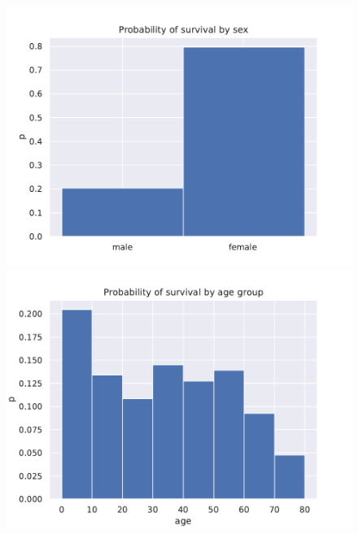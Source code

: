 \documentclass{book}
\begin{document}
\begin{figure}
    \centering
    \includegraphics[scale=.75]{../figs/prob_hist_sex.pdf}
    \includegraphics[scale=.75]{../figs/prob_hist_age.pdf}
\end{figure}
\end{document}
